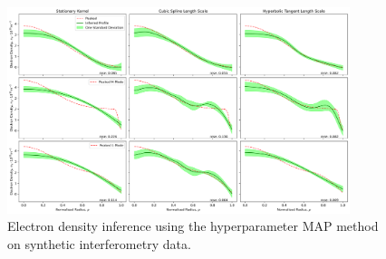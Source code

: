 \begin{figure}[ht]
    \centering
    \includegraphics[width=10cm, angle=90]{images/Final/MAPsynthetic_final_p.png}
    \caption{Electron density inference using the hyperparameter MAP method on synthetic interferometry data.}
    \label{fig:mapsynthetic}
\end{figure}





